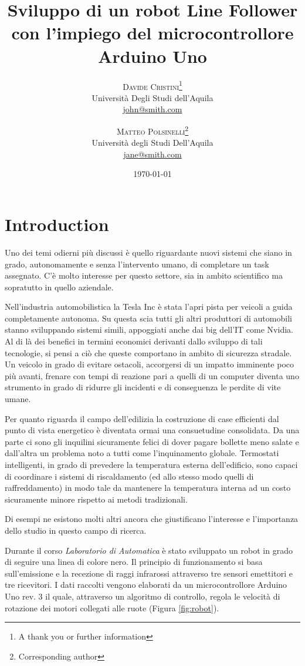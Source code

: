 \documentclass[twoside,twocolumn]{article}
\title{Sviluppo di un robot Line Follower con l'impiego del microcontrollore Arduino Uno} %
\author{%
\textsc{Davide Cristini}\thanks{A thank you or further information} \\[1ex] %
\normalsize Università Degli Studi dell'Aquila \\ %
\normalsize \href{mailto:john@smith.com}{john@smith.com} 
\and 
\textsc{Matteo Polsinelli}\thanks{Corresponding author} \\[1ex]
\normalsize Università degli Studi Dell'Aquila \\ 
\normalsize \href{mailto:polsinellimatteo91@gmail.com}{jane@smith.com}
}
\date{\today} %
\begin{document}
\maketitle


\section{Introduction}
Uno dei temi odierni più discussi è quello riguardante nuovi sistemi che siano in grado, autonomamente e senza l'intervento umano, di completare un task assegnato.
C'è molto interesse per questo settore, sia in ambito scientifico ma sopratutto in quello aziendale. 

Nell'industria automobilistica la Tesla Inc è stata l'apri pista per veicoli a guida completamente autonoma. Su questa scia tutti gli altri produttori di automobili stanno sviluppando sistemi simili, appoggiati anche dai big dell'IT come Nvidia. Al di là dei benefici in termini economici derivanti dallo sviluppo di tali tecnologie, si pensi a ciò che queste comportano in ambito di sicurezza stradale. Un veicolo in grado di evitare ostacoli, accorgersi di un impatto imminente poco più avanti, frenare con tempi di reazione pari a quelli di un  computer diventa uno strumento in grado di ridurre gli incidenti e di conseguenza le perdite di vite umane. 

Per quanto riguarda il campo dell'edilizia la costruzione di case efficienti dal punto di vista energetico è diventata ormai una consuetudine consolidata. Da una parte ci sono gli inquilini sicuramente felici di dover pagare bollette meno salate e dall'altra un problema noto a tutti come l'inquinamento globale. Termostati intelligenti, in grado di prevedere la temperatura esterna dell'edificio, sono capaci di coordinare i sistemi di riscaldamento (ed allo stesso modo quelli di raffreddamento) in modo tale da mantenere la temperatura interna ad un costo sicuramente minore rispetto ai metodi tradizionali.

Di esempi ne esistono molti altri ancora che giustificano l'interesse e l'importanza dello studio in questo campo di ricerca.

Durante il corso \textit{Laboratorio di Automatica} è stato sviluppato un robot in grado di seguire una linea di colore nero. Il principio di funzionamento si basa sull'emissione e la recezione di raggi infrarossi attraverso tre sensori emettitori e tre ricevitori. I dati raccolti vengono elaborati da un microcontrollore Arduino Uno rev. 3 il quale, attraverso un algoritmo di controllo, regola le velocità di rotazione dei motori collegati alle ruote (Figura \ref{fig:robot}).
\end{document}
